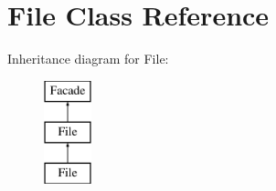 \section{File Class Reference}
\label{class_file}
Inheritance diagram for File\+:\begin{figure}[H]
\begin{center}
\leavevmode
\includegraphics[height=3.000000cm]{class_file}
\end{center}
\end{figure}

